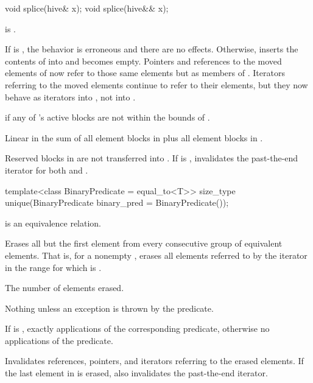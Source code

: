 %
\begin{itemdecl}
void splice(hive& x);
void splice(hive&& x);
\end{itemdecl}

\begin{itemdescr}
\pnum
\expects
{} is .

\pnum
\effects
If  is ,
the behavior is erroneous and there are no effects.
Otherwise, inserts the contents of  into  and
 becomes empty.
Pointers and references to the moved elements of 
now refer to those same elements but as members of .
Iterators referring to the moved elements continue to refer to their elements,
but they now behave as iterators into , not into .

\pnum
\throws
{} if any of 's active blocks
are not within the bounds of .

\pnum
\complexity
Linear in the sum of
all element blocks in  plus all element blocks in .

\pnum
\remarks
Reserved blocks in  are not transferred into .
If  is ,
invalidates the past-the-end iterator for both  and .
\end{itemdescr}

%
\begin{itemdecl}
template<class BinaryPredicate = equal_to<T>>
  size_type unique(BinaryPredicate binary_pred = BinaryPredicate());
\end{itemdecl}

\begin{itemdescr}
\pnum
\expects
{} is an equivalence relation.

\pnum
\effects
Erases all but the first element
from every consecutive group of equivalent elements.
That is, for a nonempty ,
erases all elements referred to by the iterator 
in the range 
for which  is .

\pnum
\returns
The number of elements erased.

\pnum
\throws
Nothing unless an exception is thrown by the predicate.

\pnum
\complexity
If  is ,
exactly  applications of the corresponding predicate,
otherwise no applications of the predicate.

\pnum
\remarks
Invalidates references, pointers, and iterators
referring to the erased elements.
If the last element in  is erased,
also invalidates the past-the-end iterator.
\end{itemdescr}

